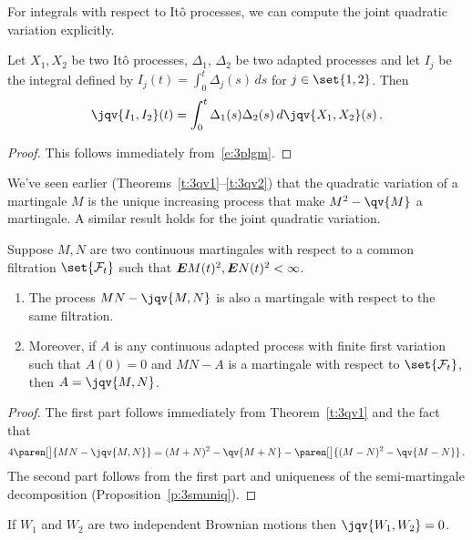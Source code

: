 For integrals with respect to It\^o processes, we can compute the joint quadratic variation explicitly.
\begin{proposition}
  Let $X_1, X_2$ be two It\^o processes, $\Delta_1$, $\Delta_2$ be two adapted processes and let $I_j$ be the integral defined by $I_j(t) = \int_0^t \Delta_j(s) \, ds$ for $j \in \set{1, 2}$.
  Then
  \begin{equation*}
    \jqv{I_1, I_2}(t) = \int_0^t \Delta_1(s) \Delta_2(s) \, d\jqv{X_1, X_2}(s) \,.
  \end{equation*}
\end{proposition}
\begin{proof}
  This follows immediately from~\eqref{e:3plgm}.
\end{proof}

We've seen earlier (Theorems~\ref{t:3qv1}--\ref{t:3qv2}) that the quadratic variation of a martingale $M$ is the unique increasing process that make $M^2 - \qv{M}$ a martingale.
A similar result holds for the joint quadratic variation.
\begin{proposition}
  Suppose $M, N$ are two continuous martingales with respect to a common filtration $\set{\mathcal F_t}$ such that $\bm{E} M(t)^2, \bm{E} N(t)^2 < \infty$.
  \begin{enumerate}
    \item
      The process $MN - \jqv{M,N}$ is also a martingale with respect to the same filtration.
    \item
      Moreover, if $A$ is any continuous adapted process with finite first variation such that $A(0) = 0$ and $MN - A$ is a martingale with respect to $\set{\mathcal F_t}$, then $A = \jqv{M,N}$.
  \end{enumerate}
\end{proposition}
\begin{proof}
  The first part follows immediately from Theorem~\ref{t:3qv1} and the fact that
  \begin{equation*}
    4 \paren[\big]{ MN - \jqv{M,N} }
      = (M+N)^2 - \qv{M+N} - \paren[\big]{(M-N)^2 - \qv{M-N}}\,.
  \end{equation*}
  The second part follows from the first part and uniqueness of the semi-martingale decomposition (Proposition~\ref{p:3smuniq}).
\end{proof}
\begin{corollary}
  If $W_1$ and $W_2$ are two independent Brownian motions then $\jqv{W_1,W_2} = 0$.
\end{corollary}
